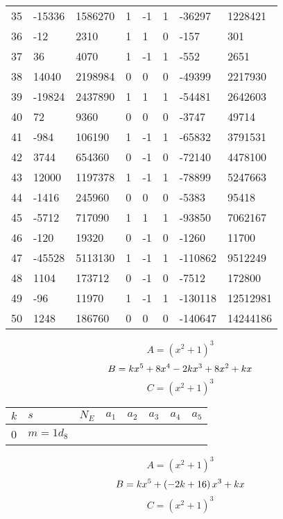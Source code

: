 \documentclass{amsart}
\begin{document}
\begin{longtable}{|l|l|l|lllll|}
35&-15336&1586270&1&-1&1&-36297&1228421\\
36&-12&2310&1&1&0&-157&301\\
37&36&4070&1&-1&1&-552&2651\\
38&14040&2198984&0&0&0&-49399&2217930\\
39&-19824&2437890&1&1&1&-54481&2642603\\
40&72&9360&0&0&0&-3747&49714\\
41&-984&106190&1&-1&1&-65832&3791531\\
42&3744&654360&0&-1&0&-72140&4478100\\
43&12000&1197378&1&-1&1&-78899&5247663\\
44&-1416&245960&0&0&0&-5383&95418\\
45&-5712&717090&1&1&1&-93850&7062167\\
46&-120&19320&0&-1&0&-1260&11700\\
47&-45528&5113130&1&-1&1&-110862&9512249\\
48&1104&173712&0&-1&0&-7512&172800\\
49&-96&11970&1&-1&1&-130118&12512981\\
50&1248&186760&0&0&0&-140647&14244186\\
\hline
\end{longtable}
$$A=(x^2
 + 1)^{3}$$
$$B=k\*x^5
 + 8\*x^4
 - 2\*k\*x^3
 + 8\*x^2
 + k\*x$$
$$C=(x^2
 + 1)^{3}$$
\begin{longtable}{|l|l|l|lllll|}
\hline
$k$ & $s$ & $N_E$ & $a_1$ & $a_2$ & $a_3$ & $a_4$ & $a_5$\\
\hline
0&$m=1d_{8}$&&\multicolumn{5}{c|}{}\\
\hline
\end{longtable}
$$A=(x^2
 + 1)^{3}$$
$$B=k\*x^5
 + \left(-2\*k
 + 16\right) \*x^3
 + k\*x$$
$$C=(x^2
 + 1)^{3}$$
\end{document}
